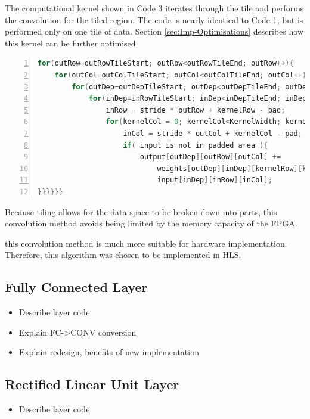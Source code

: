\documentclass[12pt]{article}
\begin{document}
The computational kernel shown in Code 3 iterates through the tile and performs the convolution for the tiled region. The code is nearly identical to Code 1, but is performed only on one tile of data. Section \ref{sec:Imp-Optimisations} describes how this kernel can be further optimised.

\renewcommand{\lstlistingname}{Code}
\begin{lstlisting}[frame=single, caption=Computational Kernel, label=code:conv-hw1, captionpos=b, numbers=left, language=C]
for(outRow=outRowTileStart; outRow<outRowTileEnd; outRow++){
	for(outCol=outColTileStart; outCol<outColTileEnd; outCol++){
		for(outDep=outDepTileStart; outDep<outDepTileEnd; outDep++){
			for(inDep=inRowTileStart; inDep<inDepTileEnd; inDep++){
				inRow = stride * outRow + kernelRow - pad;
				for(kernelCol = 0; kernelCol<KernelWidth; kernelCol++){
					inCol = stride * outCol + kernelCol - pad;
					if( input is not in padded area ){
						output[outDep][outRow][outCol] +=
							weights[outDep][inDep][kernelRow][kernelCol] *
							input[inDep][inRow][inCol];
}}}}}}
\end{lstlisting} 

Because tiling allows for the data space to be broken down into parts, this convolution method avoids being limited by the memory capacity of the FPGA. 

 this convolution method is much more suitable for hardware implementation. Therefore, this algorithm was chosen to be implemented in HLS.


\subsection{Fully Connected Layer}
\label{sec:Imp-FC}


\begin{itemize}
\item Describe layer code
\item Explain FC->CONV conversion
\item Explain redesign, benefits of new implementation
\end{itemize}

\subsection{Rectified Linear Unit Layer}
\label{sec:Imp-Relu}


\begin{itemize}
\item Describe layer code
\end{itemize}
\end{document}
